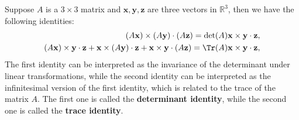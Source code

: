 Suppose \(A\) is a \(3 \times 3\) matrix and \(\mathbf{x}, \mathbf{y}, \mathbf{z}\) are three vectors in \(\mathbb{R}^3\), then we have the following identities:
\[
    \begin{aligned}
        (A \mathbf{x}) \times (A \mathbf{y}) \cdot (A \mathbf{z}) = \det(A) \mathbf{x} \times \mathbf{y} \cdot \mathbf{z}, \\
        (A \mathbf{x}) \times \mathbf{y} \cdot \mathbf{z} + \mathbf{x} \times (A \mathbf{y}) \cdot \mathbf{z} + \mathbf{x} \times \mathbf{y} \cdot (A \mathbf{z}) = \Tr(A) \mathbf{x} \times \mathbf{y} \cdot \mathbf{z},
    \end{aligned}
\]
The first identity can be interpreted as the invariance of the determinant under linear transformations, while the second identity can be interpreted as the infinitesimal version of the first identity, which is related to the trace of the matrix \(A\). The first one is called the \textbf{determinant identity}, while the second one is called the \textbf{trace identity}.
